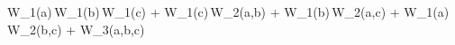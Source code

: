 W_{1}(a)\,W_{1}(b)\,W_{1}(c) + W_{1}(c)\,W_{2}(a,b) + W_{1}(b)\,W_{2}(a,c) + W_{1}(a)\,W_{2}(b,c) + W_{3}(a,b,c)